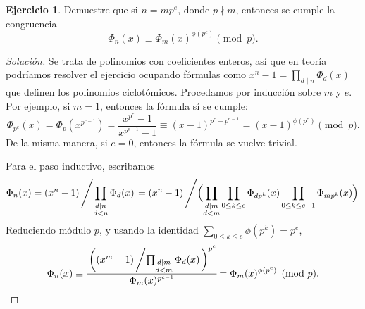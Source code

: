 \documentclass{article}
\newcounter{tarea}
\theoremstyle{definition}
\newtheorem{ejercicio}{Ejercicio}[tarea]
\newenvironment{solucion}{\begin{proof}[Solución]}{\end{proof}}
\begin{document}
\begin{ejercicio}
  Demuestre que si $n = m p^e$, donde $p \nmid m$, entonces se cumple
  la congruencia
  $$\Phi_n (x) \equiv \Phi_m (x)^{\phi (p^e)} \pmod{p}.$$

  \ifdefined\solutions
  \begin{solucion}
    Se trata de polinomios con coeficientes enteros, así que en teoría podríamos
    resolver el ejercicio ocupando fórmulas como
    $x^n - 1 = \prod_{d\mid n} \Phi_d (x)$ que definen los polinomios
    ciclotómicos. Procedamos por inducción sobre $m$ y $e$.
    Por ejemplo, si $m = 1$, entonces la fórmula sí se cumple:
    \[ \Phi_{p^e} (x) = \Phi_p (x^{p^{e-1}}) = \frac{x^{p^e} - 1}{x^{p^{e-1}} - 1} \equiv (x-1)^{p^e - p^{e-1}} = (x-1)^{\phi (p^e)} \pmod{p}. \]
    De la misma manera, si $e = 0$, entonces la fórmula se vuelve trivial.

    Para el paso inductivo, escribamos
    \[ \Phi_n (x) = (x^n-1)\left/\prod_{\substack{d \mid n \\ d < n}} \Phi_d (x)\right.
    = (x^n-1)\left/\Bigl(\prod_{\substack{d \mid m \\ d < m}}\prod_{0 \le k \le e} \Phi_{d p^k} (x)\prod_{0 \le k \le e-1} \Phi_{m p^k} (x)\Bigr)\right. \]
    Reduciendo módulo $p$, y usando la identidad
    $\sum_{0 \le k \le e} \phi (p^k) = p^e$,
    \[ \Phi_n (x) \equiv \cfrac{\left((x^m - 1)\left/\prod_{\substack{d \mid m \\ d < m}} \Phi_d (x)\right.\right)^{p^e}}{\Phi_m (x)^{p^{e-1}}} = \Phi_m (x)^{\phi (p^e)} \pmod{p}. \qedhere \]
  \end{solucion}
  \fi
\end{ejercicio}
\end{document}
